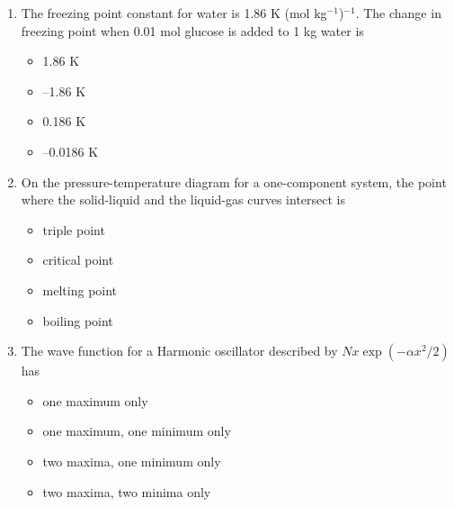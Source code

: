 \documentclass[journal,12pt,onecolumn]{IEEEtran}
\theoremstyle{remark}
\begin{document}
\begin{enumerate}
\item    \hspace{0.5cm} The freezing point constant for water is 1.86 K (mol kg$^{-1}$)$^{-1}$. The change in freezing point when 0.01 mol glucose is added to 1 kg water is  \hfill{}

\begin{multicols}{2}
\begin{itemize}[label=(A)]
    \item 1.86 K
    \item --1.86 K
    \item 0.186 K
    \item --0.0186 K
\end{itemize}
\end{multicols}
 

\item    \hspace{0.5cm} On the pressure-temperature diagram for a one-component system, the point where the solid-liquid and the liquid-gas curves intersect is  \hfill{}

\begin{multicols}{2}
\begin{itemize}[label=(A)]
    \item triple point
    \item critical point
    \item melting point
    \item boiling point
\end{itemize}
\end{multicols}

 
\item    \hspace{0.5cm} The wave function for a Harmonic oscillator described by $Nx \exp(-\alpha x^2 / 2)$ has  \hfill{}

\begin{multicols}{2}
\begin{itemize}[label=(A)]
    \item one maximum only
    \item one maximum, one minimum only
    \item two maxima, one minimum only
    \item two maxima, two minima only
\end{itemize}
\end{multicols}
 



\end{enumerate}
\end{document}
